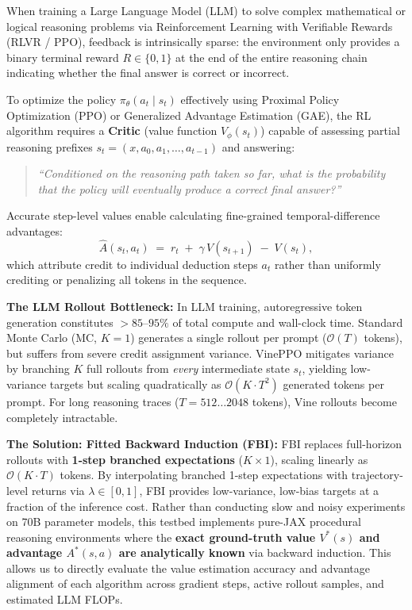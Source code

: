 \documentclass[11pt,a4paper]{article}
\begin{document}
When training a Large Language Model (LLM) to solve complex mathematical or logical reasoning problems via Reinforcement Learning with Verifiable Rewards (RLVR / PPO), feedback is intrinsically sparse: the environment only provides a binary terminal reward $R \in \{0, 1\}$ at the end of the entire reasoning chain indicating whether the final answer is correct or incorrect.

To optimize the policy $\pi_\theta(a_t \mid s_t)$ effectively using Proximal Policy Optimization (PPO) or Generalized Advantage Estimation (GAE), the RL algorithm requires a \textbf{Critic} (value function $V_\phi(s_t)$) capable of assessing partial reasoning prefixes $s_t = (x, a_0, a_1, \dots, a_{t-1})$ and answering:
\begin{quote}
\emph{``Conditioned on the reasoning path taken so far, what is the probability that the policy will eventually produce a correct final answer?''}
\end{quote}
Accurate step-level values enable calculating fine-grained temporal-difference advantages:
\[
    \hat{A}(s_t, a_t) \;=\; r_t \;+\; \gamma \, V(s_{t+1}) \;-\; V(s_t),
\]
which attribute credit to individual deduction steps $a_t$ rather than uniformly crediting or penalizing all tokens in the sequence.

\medskip
\noindent\textbf{The LLM Rollout Bottleneck:}
In LLM training, autoregressive token generation constitutes $>85\text{--}95\%$ of total compute and wall-clock time. Standard Monte Carlo (MC, $K=1$) generates a single rollout per prompt ($\mathcal{O}(T)$ tokens), but suffers from severe credit assignment variance. VinePPO mitigates variance by branching $K$ full rollouts from \emph{every} intermediate state $s_t$, yielding low-variance targets but scaling quadratically as $\mathcal{O}(K \cdot T^2)$ generated tokens per prompt. For long reasoning traces ($T = 512\dots 2048$ tokens), Vine rollouts become completely intractable.

\medskip
\noindent\textbf{The Solution: Fitted Backward Induction (FBI):}
FBI replaces full-horizon rollouts with \textbf{1-step branched expectations} ($K \times 1$), scaling linearly as $\mathcal{O}(K \cdot T)$ tokens. By interpolating branched 1-step expectations with trajectory-level returns via $\lambda \in [0, 1]$, FBI provides low-variance, low-bias targets at a fraction of the inference cost. Rather than conducting slow and noisy experiments on 70B parameter models, this testbed implements pure-JAX procedural reasoning environments where the \textbf{exact ground-truth value $V^*(s)$ and advantage $A^*(s, a)$ are analytically known} via backward induction. This allows us to directly evaluate the value estimation accuracy and advantage alignment of each algorithm across gradient steps, active rollout samples, and estimated LLM FLOPs.
\end{document}
